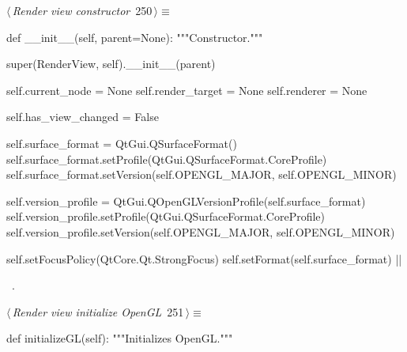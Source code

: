 \documentclass[%
    a4paper,    %
    justified,  %
    nobib,      %
    openany     %
]{tufte-book}
\makeatletter
\renewcommand{\label}[1]{\@tufte@label{##1}}%
\makeatother
\begin{document}
\begin{fullwidth}
\begin{flushleft}
\begin{minipage}{\linewidth}
\begin{list}{}{\setlength{\itemsep}{-\parsep}\setlength{\itemindent}{-\leftmargin}}
\item{}
\end{list}
\end{minipage}\vspace{4ex}
\end{flushleft}
\begin{flushleft} \small
\begin{minipage}{\linewidth}\label{scrap274}\raggedright\small
{} $\langle\,${\itshape Render view constructor}\nobreak\ {\footnotesize {250}}$\,\rangle\equiv$
\vspace{-1ex}
\begin{pythoncode}
def __init__(self, parent=None):
    """Constructor."""

    super(RenderView, self).__init__(parent)

    self.current_node  = None
    self.render_target = None
    self.renderer      = None

    self.has_view_changed = False

    self.surface_format = QtGui.QSurfaceFormat()
    self.surface_format.setProfile(QtGui.QSurfaceFormat.CoreProfile)
    self.surface_format.setVersion(self.OPENGL_MAJOR, self.OPENGL_MINOR)

    self.version_profile = QtGui.QOpenGLVersionProfile(self.surface_format)
    self.version_profile.setProfile(QtGui.QSurfaceFormat.CoreProfile)
    self.version_profile.setVersion(self.OPENGL_MAJOR, self.OPENGL_MINOR)

    self.setFocusPolicy(QtCore.Qt.StrongFocus)
    self.setFormat(self.surface_format)
|\NWsep|
\end{pythoncode}
\vspace{1.5ex}
\footnotesize
\begin{list}{}{\setlength{\itemsep}{-\parsep}\setlength{\itemindent}{-\leftmargin}}
\item \NWtxtMacroRefIn\ .

\item{}
\end{list}
\end{minipage}\vspace{4ex}
\end{flushleft}
\begin{flushleft} \small
\begin{minipage}{\linewidth}\label{scrap275}\raggedright\small
{} $\langle\,${\itshape Render view initialize OpenGL}\nobreak\ {\footnotesize {251}}$\,\rangle\equiv$
\vspace{-1ex}
\begin{pythoncode}
def initializeGL(self):
    """Initializes OpenGL."""


\end{pythoncode}
\end{minipage}
\end{flushleft}
\end{fullwidth}
\end{document}
